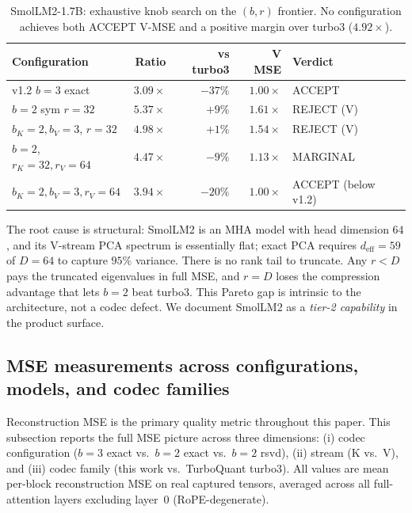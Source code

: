 \documentclass[11pt,a4paper]{article}
\theoremstyle{definition}
\theoremstyle{plain}
\begin{document}
\begin{table}[H]
\centering
\small
\caption{SmolLM2-1.7B: exhaustive knob search on the $(b, r)$ frontier. No configuration achieves both ACCEPT V-MSE and a positive margin over turbo3 ($4.92\times$).}
\label{tab:smollm2}
\begin{tabular}{lrrrl}
  \toprule
  Configuration & Ratio & vs turbo3 & V MSE & Verdict \\
  \midrule
  v1.2 $b=3$ exact              & $3.09\times$ & $-37\%$ & $1.00\times$ & ACCEPT \\
  $b=2$ sym $r=32$              & $5.37\times$ & $+9\%$  & $1.61\times$ & REJECT (V) \\
  $b_K{=}2, b_V{=}3$, $r{=}32$  & $4.98\times$ & $+1\%$  & $1.54\times$ & REJECT (V) \\
  $b=2$, $r_K{=}32, r_V{=}64$   & $4.47\times$ & $-9\%$  & $1.13\times$ & MARGINAL \\
  $b_K{=}2,b_V{=}3, r_V{=}64$   & $3.94\times$ & $-20\%$ & $1.00\times$ & ACCEPT (below v1.2) \\
  \bottomrule
\end{tabular}
\end{table}

The root cause is structural: SmolLM2 is an MHA model with head dimension $64$, and its V-stream PCA spectrum is essentially flat; exact PCA requires $d_{\text{eff}} = 59$ of $D = 64$ to capture $95\%$ variance. There is no rank tail to truncate. Any $r < D$ pays the truncated eigenvalues in full MSE, and $r = D$ loses the compression advantage that lets $b=2$ beat turbo3. This Pareto gap is intrinsic to the architecture, not a codec defect. We document SmolLM2 as a \emph{tier-2 capability} in the product surface.

\subsection{MSE measurements across configurations, models, and codec families}
\label{sec:mse-detail}

Reconstruction MSE is the primary quality metric throughout this paper. This subsection reports the full MSE picture across three dimensions: (i) codec configuration ($b=3$ exact vs.\ $b=2$ exact vs.\ $b=2$ rsvd), (ii) stream (K vs.\ V), and (iii) codec family (this work vs.\ TurboQuant turbo3). All values are mean per-block reconstruction MSE on real captured tensors, averaged across all full-attention layers excluding layer~0 (RoPE-degenerate).
\end{document}
